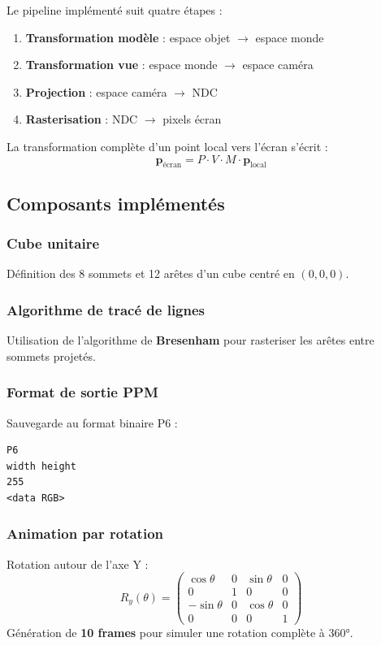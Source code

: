 \documentclass[11pt,a4paper]{article}
\begin{document}
Le pipeline implémenté suit quatre étapes :

\begin{enumerate}[itemsep=4pt]
    \item \textbf{Transformation modèle} : espace objet $\to$ espace monde
    \item \textbf{Transformation vue} : espace monde $\to$ espace caméra
    \item \textbf{Projection} : espace caméra $\to$ NDC
    \item \textbf{Rasterisation} : NDC $\to$ pixels écran
\end{enumerate}

La transformation complète d'un point local vers l'écran s'écrit :
\[
\mathbf{p}_{\text{écran}} = P \cdot V \cdot M \cdot \mathbf{p}_{\text{local}}
\]

\subsection{Composants implémentés}

\subsubsection{Cube unitaire}

Définition des 8 sommets et 12 arêtes d'un cube centré en $(0, 0, 0)$.

\subsubsection{Algorithme de tracé de lignes}

Utilisation de l'algorithme de \textbf{Bresenham} pour rasteriser les arêtes entre sommets projetés.

\subsubsection{Format de sortie PPM}

Sauvegarde au format binaire P6 :
\begin{lstlisting}
P6
width height
255
<data RGB>
\end{lstlisting}

\subsubsection{Animation par rotation}

Rotation autour de l'axe Y :
\[
R_y(\theta) = \begin{pmatrix}
\cos\theta & 0 & \sin\theta & 0 \\
0          & 1 & 0          & 0 \\
-\sin\theta& 0 & \cos\theta & 0 \\
0          & 0 & 0          & 1
\end{pmatrix}
\]
Génération de \textbf{10 frames} pour simuler une rotation complète à $360°$.
\end{document}
